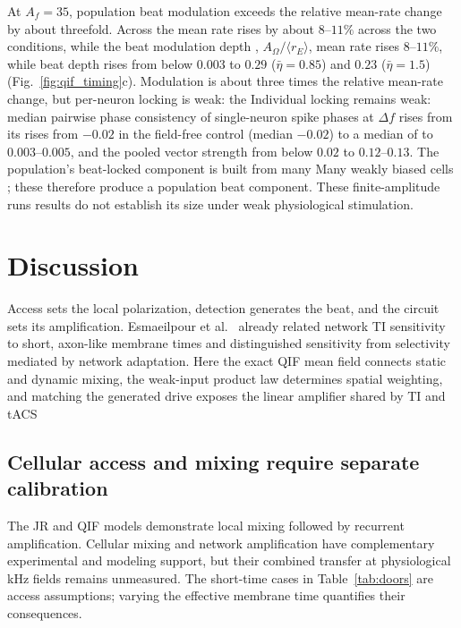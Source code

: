 \documentclass[11pt,a4paper]{article}
\providecommand{\DIFaddtex}[1]{{\protect\color{blue} \sf #1}} %
\providecommand{\DIFdeltex}[1]{{\protect\color{red} \scriptsize #1}} %
\providecommand{\DIFaddbegin}{} %
\providecommand{\DIFaddend}{} %
\providecommand{\DIFdelbegin}{} %
\providecommand{\DIFdelend}{} %
\providecommand{\DIFadd}[1]{\texorpdfstring{\DIFaddtex{#1}}{#1}} %
\providecommand{\DIFdel}[1]{\texorpdfstring{\DIFdeltex{#1}}{}} %
\begin{document}
\DIFadd{At $A_f=35$, population beat modulation exceeds the relative mean-rate
change by about threefold. Across }\DIFaddend the \DIFdelbegin \DIFdel{mean rate rises by about $8$--$11\%$ across the }\DIFdelend two conditions, \DIFdelbegin \DIFdel{while the beat modulation
depth , $A_\Omega/\langle r_E\rangle$, }\DIFdelend \DIFaddbegin \DIFadd{mean rate rises
$8$--$11\%$, while beat depth }\DIFaddend rises from below $0.003$ to $0.29$
($\bar\eta=0.85$) and $0.23$ ($\bar\eta=1.5$)
(Fig.~\ref{fig:qif_timing}c). \DIFdelbegin \DIFdel{Modulation is about three times the relative mean-rate change, but per-neuron
locking is weak: the }\DIFdelend \DIFaddbegin \DIFadd{Individual locking remains weak: median
}\DIFaddend pairwise phase consistency \DIFdelbegin \DIFdel{of single-neuron spike phases at
$\Delta f$ rises from its }\DIFdelend \DIFaddbegin \DIFadd{rises from $-0.02$ in the }\DIFaddend field-free control
\DIFdelbegin \DIFdel{(median $-0.02$) to a median of
}\DIFdelend \DIFaddbegin \DIFadd{to }\DIFaddend $0.003$--$0.005$, and \DIFdelbegin \DIFdel{the }\DIFdelend pooled vector strength from below $0.02$ to
$0.12$--$0.13$. \DIFdelbegin \DIFdel{The
population's beat-locked component is built from many }\DIFdelend \DIFaddbegin \DIFadd{Many }\DIFaddend weakly biased cells \DIFdelbegin \DIFdel{; these
}\DIFdelend \DIFaddbegin \DIFadd{therefore produce a population
beat component. These }\DIFaddend finite-amplitude \DIFdelbegin \DIFdel{runs }\DIFdelend \DIFaddbegin \DIFadd{results }\DIFaddend do not establish its size
under weak physiological stimulation.

\section{Discussion}\label{sec:discussion}
\DIFdelbegin \DIFdel{Access sets the local polarization, detection generates the beat, and the circuit
sets its amplification. Esmaeilpour et al.\
\cite{esmaeilpour2021} already related network TI sensitivity to short, axon-like
membrane times and distinguished sensitivity from selectivity mediated by
network
adaptation. Here the exact QIF mean field connects static and dynamic
mixing, the weak-input product law determines spatial weighting, and matching
the generated drive exposes the linear amplifier shared by TI and tACS}\DIFdelend \DIFaddbegin \subsection{\DIFadd{Cellular access and mixing require separate calibration}}
\DIFadd{The JR and QIF models demonstrate local mixing followed by recurrent
amplification. Cellular mixing \cite{mirzakhalili2020,luff2024mixer} and network
amplification \cite{caldas2024,karimi2024,esmaeilpour2021} have complementary
experimental and modeling support, but their combined transfer at physiological
kHz fields remains unmeasured. The short-time cases in Table~\ref{tab:doors}
are access assumptions; varying the effective membrane time quantifies their
consequences}\DIFaddend .
\end{document}
